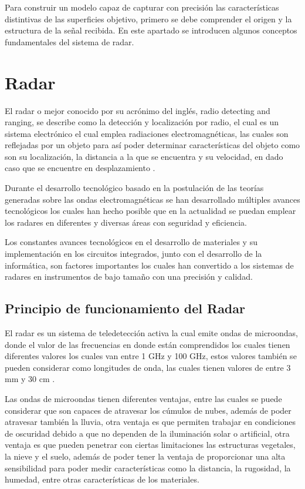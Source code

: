 
Para construir un modelo capaz de capturar con precisión las características distintivas de las superficies objetivo, primero se debe comprender el origen y la estructura de la señal recibida. En este apartado se introducen algunos conceptos fundamentales del sistema de radar. 

\section{Radar}

El radar o mejor conocido por su acrónimo del inglés, radio detecting and ranging, se describe como la detección y localización por radio, el cual es un sistema electrónico el cual emplea radiaciones electromagnéticas, las cuales son reflejadas por un objeto para así poder determinar características del objeto como son su localización, la distancia a la que se encuentra y su velocidad, en dado caso que se encuentre en desplazamiento \cite{AlonsoCerpa}. 

Durante el desarrollo tecnológico basado en la postulación de las teorías generadas sobre las ondas electromagnéticas se han desarrollado múltiples avances tecnológicos los cuales han hecho posible que en la actualidad se puedan emplear los radares en diferentes y diversas áreas con seguridad y eficiencia. 

Los constantes avances tecnológicos en el desarrollo de materiales y su implementación en los circuitos integrados, junto con el desarrollo de la informática, son factores importantes los cuales han convertido a los sistemas de radares en instrumentos de bajo tamaño con una precisión y calidad. 

\subsection{Principio de funcionamiento del Radar}

El radar es un sistema de teledetección activa la cual emite ondas de microondas, donde el valor de las frecuencias en donde están comprendidos los cuales tienen diferentes valores los cuales van entre 1 GHz y 100 GHz, estos valores también se pueden considerar como longitudes de onda, las cuales tienen valores de entre 3 mm y 30 cm \cite{HerreraG2009}. 

Las ondas de microondas tienen diferentes ventajas, entre las cuales se puede considerar que son capaces de atravesar los cúmulos de nubes, además de poder atravesar también la lluvia, otra ventaja es que permiten trabajar en condiciones de oscuridad debido a que no dependen de la iluminación solar o artificial, otra ventaja es que pueden penetrar con ciertas limitaciones las estructuras vegetales, la nieve y el suelo, además de poder tener la ventaja de proporcionar una alta sensibilidad para poder medir características como la distancia, la rugosidad, la humedad, entre otras características de los materiales. 

